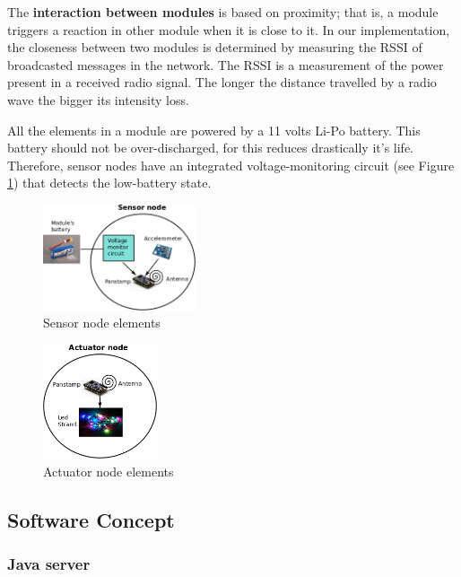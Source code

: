 The \textbf{interaction between modules} is based on proximity; that is, a module triggers a reaction in other module when it is close to it. In our implementation, the closeness between two modules is determined by measuring the RSSI of broadcasted messages in the network. The RSSI is a measurement of the power present in a received radio signal. The longer the distance travelled by a radio wave the bigger its intensity loss.

All the elements in a module are powered by a 11 volts Li-Po battery. This battery should not be over-discharged, for this reduces drastically it's life. Therefore, sensor nodes have an integrated voltage-monitoring circuit (see Figure \ref{fig:sensor-node}) that detects the  low-battery state.

\begin{figure}[h!]
 \centering
 \includegraphics[width= 0.4\textwidth, clip=true  ,keepaspectratio=true]{./graph/sensor_node.png}
 \caption{Sensor node elements}
 \label{fig:sensor-node}
\end{figure}


\begin{figure}[h!]
 \centering
 \includegraphics[width= 0.3\textwidth, clip=true  ,keepaspectratio=true]{./graph/actuator_node.png}
 \caption{Actuator node elements}
 \label{fig:actuator-node}
\end{figure}


\subsection{Software Concept} 
\subsubsection{Java server}

